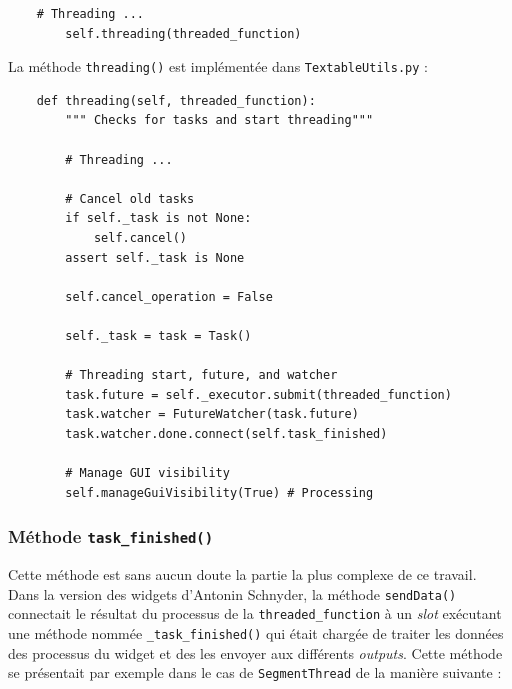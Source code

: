 \documentclass{article}
\begin{document}
\begin{verbatim}
    # Threading ...
        self.threading(threaded_function)
\end{verbatim}

La méthode \texttt{threading()} est implémentée dans \texttt{TextableUtils.py} : 

\begin{verbatim}
    def threading(self, threaded_function):
        """ Checks for tasks and start threading"""

        # Threading ...

        # Cancel old tasks
        if self._task is not None:
            self.cancel()
        assert self._task is None

        self.cancel_operation = False

        self._task = task = Task()
        
        # Threading start, future, and watcher
        task.future = self._executor.submit(threaded_function)
        task.watcher = FutureWatcher(task.future)
        task.watcher.done.connect(self.task_finished)
        
        # Manage GUI visibility
        self.manageGuiVisibility(True) # Processing
\end{verbatim}

\subsubsection{Méthode \texttt{task\_finished()}}

Cette méthode est sans aucun doute la partie la plus complexe de ce travail. Dans la version des widgets d'Antonin Schnyder, la méthode \texttt{sendData()} connectait le résultat du processus de la \texttt{threaded\_function} à un \textit{slot} exécutant une méthode nommée \texttt{\_task\_finished()} qui était chargée de traiter les données des processus du widget et des les envoyer aux différents \textit{outputs}. Cette méthode se présentait par exemple dans le cas de \texttt{SegmentThread} de la manière suivante : 
\end{document}
